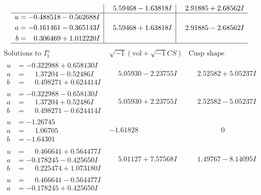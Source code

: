 \documentclass[1p]{elsarticle_modified}
\theoremstyle{definition}
\newcommand{\I}{\sqrt{-1}}
\begin{document}
$$\begin{array}{c|c|c}
 & \phantom{-}5.59468 - 1.63818 I & \phantom{-}2.91885 + 2.68562 I \\ \hline\begin{aligned}
u &= -0.488518 - 0.562688 I \\
a &= -0.161461 - 0.365143 I \\
b &= \phantom{-}0.306469 + 1.012220 I\end{aligned}
 & \phantom{-}5.59468 + 1.63818 I & \phantom{-}2.91885 - 2.68562 I\\
 \hline 
 \end{array}$$\newpage$$\begin{array}{c|c|c}  
\text{Solutions to }I^u_{1}& \I (\text{vol} + \sqrt{-1}CS) & \text{Cusp shape}\\
 \hline 
\begin{aligned}
u &= -0.322988 + 0.658130 I \\
a &= \phantom{-}1.37204 - 0.52486 I \\
b &= \phantom{-}0.498271 + 0.624414 I\end{aligned}
 & \phantom{-}5.05930 - 2.23755 I & \phantom{-}2.52582 + 5.05237 I \\ \hline\begin{aligned}
u &= -0.322988 - 0.658130 I \\
a &= \phantom{-}1.37204 + 0.52486 I \\
b &= \phantom{-}0.498271 - 0.624414 I\end{aligned}
 & \phantom{-}5.05930 + 2.23755 I & \phantom{-}2.52582 - 5.05237 I \\ \hline\begin{aligned}
u &= -1.26745\phantom{ +0.000000I} \\
a &= \phantom{-}1.06705\phantom{ +0.000000I} \\
b &= -1.64301\phantom{ +0.000000I}\end{aligned}
 & -1.61828\phantom{ +0.000000I} & \phantom{-0.000000 } 0 \\ \hline\begin{aligned}
u &= \phantom{-}0.466641 + 0.564477 I \\
a &= -0.178245 - 0.425650 I \\
b &= \phantom{-}0.225474 + 1.073180 I\end{aligned}
 & \phantom{-}5.01127 + 7.57568 I & \phantom{-}1.49767 - 8.14095 I \\ \hline\begin{aligned}
u &= \phantom{-}0.466641 - 0.564477 I \\
a &= -0.178245 + 0.425650 I \\

\end{aligned}
\end{array}$$
\end{document}
